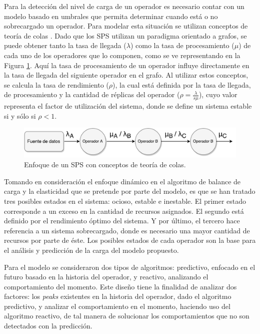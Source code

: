 Para la detección del nivel de carga de un operador es necesario contar con un modelo basado en umbrales que permita determinar cuando está o no sobrecargado un operador. Para modelar esta situación se utilizan conceptos de teoría de colas \citep{bose2013introduction}. Dado que los SPS utilizan un paradigma orientado a grafos, se puede obtener tanto la tasa de llegada ($\lambda$) como la tasa de procesamiento ($\mu$) de cada uno de los operadores que lo componen, como se ve representando en la Figura \ref{fig:analisisTeoriaColas}. Aquí la tasa de procesamiento de un operador influye directamente en la tasa de llegada del siguiente operador en el grafo. Al utilizar estos conceptos, se calcula la tasa de rendimiento ($\rho$), la cual está definida por la tasa de llegada, de procesamiento y la cantidad de réplicas del operador ($\rho = \frac{\lambda}{s \mu}$), cuyo valor representa el factor de utilización del sistema, donde se define un sistema estable si y sólo si $\rho < 1$.

\begin{figure}[!hb]
	\centering
		\includegraphics[scale=0.6]{images/AnalisisTeoriaColas.pdf}
	\caption{Enfoque de un SPS con conceptos de teoría de colas.}
	\label{fig:analisisTeoriaColas}
\end{figure}

Tomando en consideración el enfoque dinámico en el algoritmo de balance de carga y la elasticidad que se pretende por parte del modelo, es que se han tratado tres posibles estados en el sistema: ocioso, estable e inestable. El primer estado corresponde a un exceso en la cantidad de recursos asignados. El segundo está definido por el rendimiento óptimo del sistema. Y por último, el tercero hace referencia a un sistema sobrecargado, donde es necesario una mayor cantidad de recursos por parte de éste. Los posibles estados de cada operador son la base para el análisis y predicción de la carga del modelo propuesto.

Para el modelo se consideraron dos tipos de algoritmos: predictivo, enfocado en el futuro basado en la historia del operador, y reactivo, analizando el comportamiento del momento. Este diseño tiene la finalidad de analizar dos factores: los \textit{peaks} existentes en la historia del operador, dado el algoritmo predictivo, y analizar el comportamiento en el momento, haciendo uso del algoritmo reactivo, de tal manera de solucionar los comportamientos que no son detectados con la predicción.

